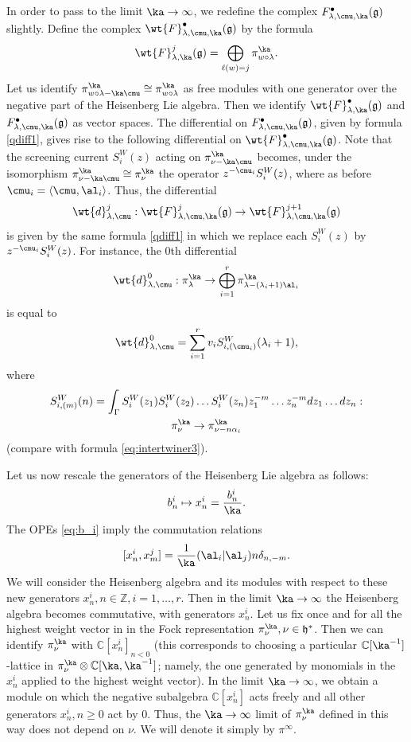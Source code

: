 \documentclass{amsart}
\newcommand{\bra}{{\langle}}
\newcommand{\+}{\mathop{\oplus}}
\renewcommand{\*}{{\otimes}}
\newcommand{\mf}{\mathfrak}
\newcommand{\g}{\mf{g}}
\newcommand{\h}{\mf{h}}
\newcommand{\Z}{\mathbb{Z}}
\newcommand{\C}{\mathbb{C}}
\newcommand{\ra}{\rightarrow}
\newcommand{\lam}{\lambda}
\def\geq{\geqslant}
\theoremstyle{theorem}
\theoremstyle{remark}
\numberwithin{equation}{section}
\begin{document}
In order to pass to the limit $\ka \to \infty$, we redefine the
complex $F^\bullet_{\lam,\cmu,\ka}(\g)$ slightly. Define the complex
$\wt{F}^\bullet_{\lam,\cmu,\ka}(\g)$ by the formula
$$
\wt{F}^j_{\lam,\ka}(\g) = \bigoplus_{\ell(w)=j} \pi^\ka_{w \circ \lam}.
$$
Let us identify $\pi^\ka_{w \circ \lam - \ka\cmu} \cong \pi^\ka_{w
  \circ \lam}$ as free modules with one generator over the negative
part of the Heisenberg Lie algebra. Then we identify
$\wt{F}^\bullet_{\lam,\ka}(\g)$ and $F^\bullet_{\lam,\cmu,\ka}(\g)$ as
vector spaces. The differential on $F^\bullet_{\lam,\cmu,\ka}(\g)$,
given by formula \eqref{qdiff1}, gives rise to the following
differential on $\wt{F}^\bullet_{\lam,\cmu,\ka}(\g)$. Note that the
screening current $S^W_i(z)$ acting on $\pi^\ka_{\nu-\ka\cmu}$
becomes, under the isomorphism $\pi^\ka_{\nu-\ka\cmu} \cong
\pi^\ka_\nu$ the operator $z^{-\cmu_i}S^W_i(z)$, where as before
$\cmu_i = \bra \cmu,\al_i\rangle$. Thus, the differential
$$
\wt{d}^j_{\lam,\cmu}: \wt{F}^j_{\lam,\cmu,\ka}(\g) \to
\wt{F}^{j+1}_{\lam,\cmu,\ka}(\g)
$$
is given by the same formula \eqref{qdiff1} in which we replace each
$S^W_i(z)$ by $z^{-\cmu_i} S^W_i(z)$. For instance, the $0$th
differential
\begin{equation}    \label{zeroth diff1}
\wt{d}^0_{\lam,\cmu}: \pi^\ka_\lam \to \bigoplus_{i=1}^r
\pi^\ka_{\lam-(\lam_i+1)\al_i}
\end{equation}
is equal to
\begin{equation}    \label{sum scr1}
\wt{d}^0_{\lam,\cmu} = \sum_{i=1}^{r} v_i S^W_{i,(\cmu_i)}(\lam_i+1),
\end{equation}
where
\begin{multline}
S^W_{i,(m)}(n) = \int_{\Gamma} S^W_i(z_1)S^W_i(z_2)\dots S^W_i(z_n)
 z_1^{-m} \dots z_n^{-m} dz_1 \dots dz_n: \\
 \pi^\ka_{\nu}\ra \pi^\ka_{\nu-n\alpha_i}
\label{eq:intertwiner4}
\end{multline}
(compare with formula \eqref{eq:intertwiner3}).

Let us now rescale the generators of the Heisenberg Lie algebra as
follows:
$$
b^i_n \mapsto x^i_n = \frac{b^i_n}{\ka}.
$$
The OPEs \eqref{eq:b_i} imply the commutation relations
$$
[x^i_n,x^j_m] = \frac{1}{\ka} (\al_i|\al_j) n \delta_{n,-m}.
$$
We will consider the Heisenberg algebra and its modules with respect
to these new generators $x^i_n, n \in \Z, i=1,\dots,r$. Then in the
limit $\ka \to \infty$ the Heisenberg algebra becomes commutative,
with generators $x^i_n$. Let us fix once and for all the highest
weight vector in in the Fock representation $\pi^\ka_\nu, \nu \in
\h^*$. Then we can identify $\pi^\ka_\nu$ with $\C[x^i_n]_{n<0}$ (this
corresponds to choosing a particular $\C[\ka^{-1}]$-lattice in
$\pi^\ka_\nu \otimes \C[\ka,\ka^{-1}]$; namely, the one generated by
monomials in the $x^i_n$ applied to the highest weight vector). In the
limit $\ka \to \infty$, we obtain a module on which the negative
subalgebra $\C[x^i_n]$ acts freely and all other generators $x^i_n, n
\geq 0$ act by $0$. Thus, the $\ka \to \infty$ limit of $\pi^\ka_\nu$
defined in this way does not depend on $\nu$. We will denote it simply
by $\pi^\infty$.
\end{document}
